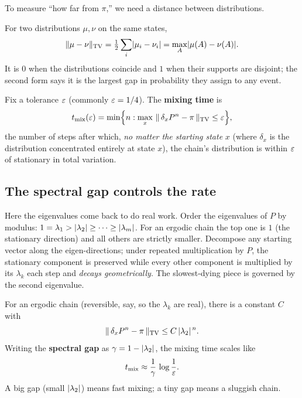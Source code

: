 To measure ``how far from $\pi$,'' we need a distance between distributions.

\begin{definition}
\label{ch24:def-tv}
For two distributions $\mu,\nu$ on the same states,
\[
  \norm{\mu - \nu}_{\mathrm{TV}} = \tfrac12 \sum_i \abs{\mu_i - \nu_i}
  = \max_{A} \abs{\mu(A) - \nu(A)} .
\]
It is $0$ when the distributions coincide and $1$ when their supports are disjoint;
the second form says it is the largest gap in probability they assign to any event.
\end{definition}

\begin{definition}
\label{ch24:def-mixing}
Fix a tolerance $\eps$ (commonly $\eps = 1/4$). The \textbf{mixing time} is
\[
  t_{\mathrm{mix}}(\eps) = \min\set[\Big]{ n : \max_{x}\ \norm{\,\delta_x P^n - \pi\,}_{\mathrm{TV}} \le \eps },
\]
the number of steps after which, \emph{no matter the starting state} $x$ (where $\delta_x$ is the distribution concentrated entirely at state $x$), the
chain's distribution is within $\eps$ of stationary in total variation.
\end{definition}

\subsection{The spectral gap controls the rate}

Here the eigenvalues come back to do real work. Order the eigenvalues of $P$ by
modulus: $1 = \lambda_1 > \abs{\lambda_2} \ge \cdots \ge \abs{\lambda_m}$. For an
ergodic chain the top one is $1$ (the stationary direction) and all others are
strictly smaller. Decompose any starting vector along the eigen-directions; under
repeated multiplication by $P$, the stationary component is preserved while every
other component is multiplied by its $\lambda_k$ each step and \emph{decays
geometrically}. The slowest-dying piece is governed by the second eigenvalue.

\begin{theorem}
\label{ch24:thm-spectral}
For an ergodic chain (reversible, say, so the $\lambda_k$ are real), there is a
constant $C$ with
\[
  \norm{\,\delta_x P^n - \pi\,}_{\mathrm{TV}} \le C\,\abs{\lambda_2}^{\,n}.
\]
Writing the \textbf{spectral gap} as $\gamma = 1 - \abs{\lambda_2}$, the mixing
time scales like
\[
  t_{\mathrm{mix}} \approx \frac{1}{\gamma}\,\log\frac{1}{\eps}.
\]
A big gap (small $\abs{\lambda_2}$) means fast mixing; a tiny gap means a sluggish
chain.
\end{theorem}

